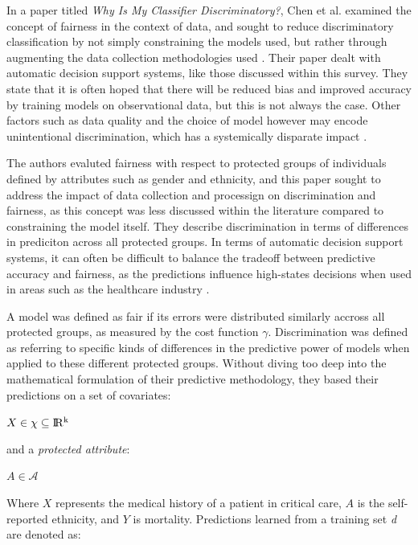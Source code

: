 \documentclass[a4paper]{article}
\begin{document}
In a paper titled \textit{Why Is My Classifier Discriminatory?}, Chen et al. examined the concept of fairness in the context of data, and sought to reduce discriminatory classification by not simply constraining the models used, but rather through augmenting the data collection methodologies used \cite{Chen_2018}. Their paper dealt with automatic decision support systems, like those discussed within this survey. They state that it is often hoped that there will be reduced bias and improved accuracy by training models on observational data, but this is not always the case. Other factors such as data quality and the choice of model however may encode unintentional discrimination, which has a systemically disparate impact \cite{Chen_2018}.

The authors evaluted fairness with respect to protected groups of individuals defined by attributes such as gender and ethnicity, and this paper sought to address the impact of data collection and processign on discrimination and fairness, as this concept was less discussed within the literature compared to constraining the model itself. They describe discrimination in terms of differences in prediciton across all protected groups. In terms of automatic decision support systems, it can often be difficult to balance the tradeoff between predictive accuracy and fairness, as the predictions influence high-states decisions when used in areas such as the healthcare industry \cite{Chen_2018}.

A model was defined as fair if its errors were distributed similarly accross all protected groups, as measured by the cost function $\gamma$. Discrimination was defined as referring to specific kinds of differences in the predictive power of models when applied to these different protected groups. Without diving too deep into the mathematical formulation of their predictive methodology, they based their predictions on a set of covariates:

\begin{center}
    $X \in \chi \subseteq \rm I\!R^k$
\end{center}

\noindent and a \textit{protected attribute}:

\begin{center}
    $A \in \mathcal{A}$
\end{center}

Where $X$ represents the medical history of a patient in critical care, $A$ is the self-reported ethnicity, and $Y$ is mortality. Predictions learned from a training set \textit{d} are denoted as:
\end{document}
